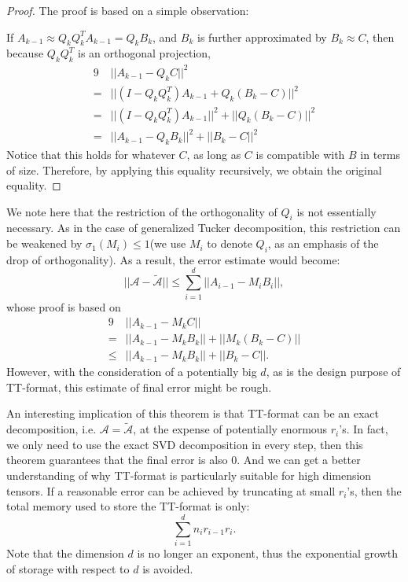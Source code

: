 \documentclass[12pt]{article}
\begin{document}
\begin{proof}
The proof is based on a simple observation: 

If $A_{k-1} \approx Q_kQ_k^TA_{k-1} = Q_kB_k$, and $B_k$ is further approximated by $B_k \approx C$, then because $Q_kQ_k^T$ is an orthogonal projection,
\begin{alignat*}{9}
 & ||A_{k-1} - Q_kC|| ^ 2 \\
= & || (I - Q_kQ_k^T)A_{k-1} + Q_k(B_k - C) || ^ 2  \\
=  & || (I - Q_kQ_k^T)A_{k-1} || ^ 2 + || Q_k(B_k - C) || ^ 2 \\
= & || A_{k-1} - Q_kB_k || ^ 2 + || B_k  - C || ^ 2
\end{alignat*}
Notice that this holds for whatever $C$, as long as $C$ is compatible with $B$ in terms of size. Therefore, by applying this equality recursively, we obtain the original equality.
\end{proof}

\begin{myrmk}
We note here that the restriction of the orthogonality of $Q_i$ is not essentially necessary. As in the case of generalized Tucker decomposition, this restriction can be weakened by $\sigma_1(M_i) \leq 1$(we use $M_i$ to denote $Q_i$, as an emphasis of the drop of orthogonality). As a result, the error estimate would become:
$$ || \mathcal{A} - \tilde{\mathcal{A}} || \leq \sum_{i=1}^d || A_{i-1} - M_iB_i ||,$$
whose proof is based on
\begin{alignat*}{9}
 & ||A_{k-1} - M_kC|| \\ 
=  & || A_{k-1} - M_kB_k || + || M_k(B_k - C) || \\
\leq & || A_{k-1} - M_kB_k || + || B_k  - C ||.
\end{alignat*}
However, with the consideration of a potentially big $d$, as is the design purpose of TT-format, this estimate of final error might be rough.
\end{myrmk}

\begin{myrmk}
An interesting implication of this theorem is that TT-format can be an exact decomposition, i.e. $\mathcal{A} = \tilde{\mathcal{A}}$, at the expense of potentially enormous $r_i$'s. In fact, we only need to use the exact SVD decomposition in every step, then this theorem guarantees that the final error is also 0. And we can get a better understanding of why TT-format is particularly suitable for high dimension tensors. If a reasonable error can be achieved by truncating at small $r_i$'s, then the total memory used to store the TT-format is only:
$$ \sum_{i = 1}^d n_i  r_{i-1} r_i. $$
Note that the dimension $d$ is no longer an exponent, thus the exponential growth of storage with respect to $d$ is avoided.
\end{myrmk}
\end{document}
